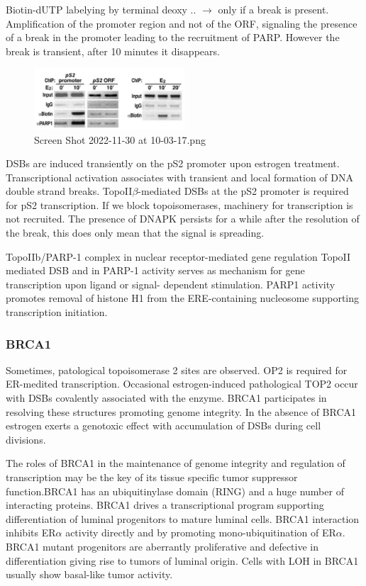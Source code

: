 Biotin-dUTP labelying by terminal deoxy .. $\rightarrow$ only if a break is present. Amplification of the promoter region and not of the ORF, signaling the presence of a break in the promoter leading to the recruitment of PARP. However the break is transient, after 10 minutes it disappears.

\begin{figure}
\centering
\includegraphics[width=0.5\textwidth]{../_resources/Screen_Shot_2022-11-30_at_10-03-17.png}
\caption{Screen Shot 2022-11-30 at 10-03-17.png}
\end{figure}

DSBs are induced transiently on the pS2 promoter upon estrogen treatment. Transcriptional activation associates with transient and local formation of DNA double strand breaks. TopoII$\beta$-mediated DSBs at the pS2 promoter is required for pS2 transcription. If we block topoisomerases, machinery for transcription is not recruited. The presence of DNAPK persists for a while after the resolution of the break, this does only mean that the signal is spreading.

TopoIIb/PARP-1 complex in nuclear receptor-mediated gene regulation TopoII mediated DSB and in PARP-1 activity serves as mechanism for gene transcription upon ligand or signal- dependent stimulation. PARP1 activity promotes removal of histone H1 from the ERE-containing nucleosome supporting transcription initiation.

\hypertarget{brca1}{%
\subsubsection{BRCA1}\label{brca1}}

Sometimes, patological topoisomerase 2 sites are observed. OP2 is required for ER-medited transcription. Occasional estrogen-induced pathological TOP2 occur with DSBs covalently associated with the enzyme. BRCA1 participates in resolving these structures promoting genome integrity. In the absence of BRCA1 estrogen exerts a genotoxic effect with accumulation of DSBs during cell divisions.

The roles of BRCA1 in the maintenance of genome integrity and regulation of transcription may be the key of its tissue specific tumor suppressor function.BRCA1 has an ubiquitinylase domain (RING) and a huge number of interacting proteins. BRCA1 drives a transcriptional program supporting differentiation of luminal progenitors to mature luminal cells. BRCA1 interaction inhibits ER$\alpha$ activity directly and by promoting mono-ubiquitination of ER$\alpha$. BRCA1 mutant progenitors are aberrantly proliferative and defective in differentiation giving rise to tumors of luminal origin. Cells with LOH in BRCA1 usually show basal-like tumor activity.

